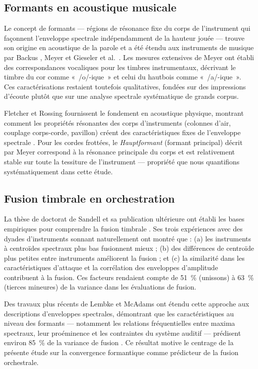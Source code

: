 \documentclass[12pt,a4paper]{article}
\begin{document}
\subsection{Formants en acoustique musicale}

Le concept de formants --- régions de résonance fixe du corps de l'instrument qui
façonnent l'enveloppe spectrale indépendamment de la hauteur jouée --- trouve son
origine en acoustique de la parole \citep{Fant1960} et a été étendu aux instruments
de musique par Backus \citep{Backus1969}, Meyer \citep{Meyer2009} et Gieseler et al.\
\citep{Gieseler1985}. Les mesures extensives de Meyer ont établi des correspondances
vocaliques pour les timbres instrumentaux, décrivant le timbre du cor comme «~/o/-ique~»
et celui du hautbois comme «~/a/-ique~». Ces caractérisations restaient toutefois
qualitatives, fondées sur des impressions d'écoute plutôt que sur une analyse spectrale
systématique de grands corpus.

Fletcher et Rossing fournissent le fondement en acoustique physique, montrant comment
les propriétés résonantes des corps d'instruments (colonnes d'air, couplage corps-corde,
pavillon) créent des caractéristiques fixes de l'enveloppe spectrale \citep{Fletcher1998}.
Pour les cordes frottées, le \emph{Hauptformant} (formant principal) décrit par Meyer
correspond à la résonance principale du corps et est relativement stable sur toute la
tessiture de l'instrument --- propriété que nous quantifions systématiquement dans
cette étude.

\subsection{Fusion timbrale en orchestration}

La thèse de doctorat de Sandell et sa publication ultérieure ont établi les bases
empiriques pour comprendre la fusion timbrale \citep{Sandell1991,Sandell1995}. Ses
trois expériences avec des dyades d'instruments sonnant naturellement ont montré que :
(a) les instruments à centroïdes spectraux plus bas fusionnent mieux ; (b) des
différences de centroïde plus petites entre instruments améliorent la fusion ; et
(c) la similarité dans les caractéristiques d'attaque et la corrélation des enveloppes
d'amplitude contribuent à la fusion. Ces facteurs rendaient compte de 51~\% (unissons)
à 63~\% (tierces mineures) de la variance dans les évaluations de fusion.

Des travaux plus récents de Lembke et McAdams ont étendu cette approche aux
descriptions d'enveloppes spectrales, démontrant que les caractéristiques au niveau
des formants --- notamment les relations fréquentielles entre maxima spectraux, leur
proéminence et les contraintes du système auditif --- prédisent environ 85~\% de la
variance de fusion \citep{Lembke2015,Lembke2017}. Ce résultat motive le centrage de
la présente étude sur la convergence formantique comme prédicteur de la fusion orchestrale.
\end{document}
